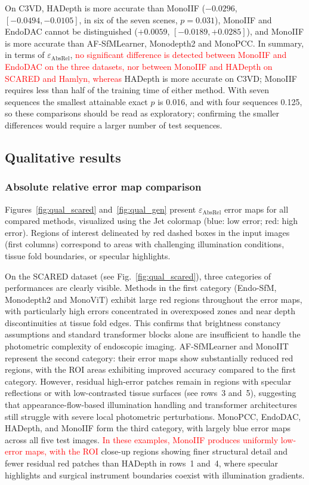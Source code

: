 \documentclass[a4paper,fleqn]{cas-dc}
\begin{document}
On C3VD, HADepth is more accurate than MonoIIF ($-0.0296$, $[-0.0494, -0.0105]$, in six of the seven scenes, $p=0.031$), MonoIIF and EndoDAC cannot be distinguished ($+0.0059$, $[-0.0189, +0.0285]$), and MonoIIF is more accurate than AF-SfMLearner, Monodepth2 and MonoPCC.
In summary, in terms of $\varepsilon_\textrm{AbsRel}$, \textcolor{red}{no significant difference is detected between MonoIIF and EndoDAC on the three datasets, nor between MonoIIF and HADepth on SCARED and Hamlyn, whereas} HADepth is more accurate on C3VD; MonoIIF requires less than half of the training time of either method. With seven sequences the smallest attainable exact $p$ is 0.016, and with four sequences 0.125, so these comparisons should be read as exploratory; confirming the smaller differences would require a larger number of test sequences.

%
\subsection{Qualitative results}
\subsubsection{Absolute relative error map comparison}

Figures~\ref{fig:qual_scared} and~\ref{fig:qual_gen} present $\varepsilon_{\text{AbsRel}}$ error maps for 
all compared methods, visualized using the Jet colormap (blue: low error; red: high error). Regions of interest delineated by red dashed boxes in the input images (first columns) correspond to areas with challenging illumination conditions, tissue fold boundaries, or specular highlights.


On the SCARED dataset (see Fig.~\ref{fig:qual_scared}), three categories of performances are clearly visible. 
Methods in the first category (Endo-SfM, Monodepth2 and MonoViT) exhibit large red regions throughout the error maps, with particularly high errors concentrated in overexposed zones and near depth discontinuities 
at tissue fold edges. This confirms that brightness constancy assumptions and standard transformer blocks alone are insufficient to handle the photometric complexity of endoscopic imaging. AF-SfMLearner and MonoIIT represent the second category: their error maps show substantially reduced red regions, with the ROI areas exhibiting improved accuracy compared to the first category. However, residual high-error patches remain in regions with specular reflections or with low-contrasted tissue surfaces (see rows~3 and~5), suggesting that appearance-flow-based illumination handling and transformer architectures still struggle with severe local photometric perturbations. MonoPCC, EndoDAC, HADepth, and MonoIIF form the third category, with largely blue error maps across all five test images. \textcolor{red}{In these examples, MonoIIF produces uniformly low-error maps, with the ROI} close-up regions showing finer structural detail and fewer residual red patches than HADepth in rows~1 and~4, where specular highlights and surgical instrument boundaries coexist with illumination gradients.
\end{document}
